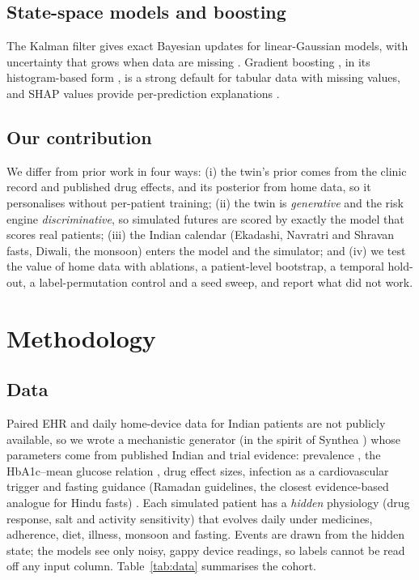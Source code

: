 \documentclass[conference]{IEEEtran}
\begin{document}
\subsection{State-space models and boosting} The Kalman filter \cite{kalman1960} gives exact Bayesian updates for linear-Gaussian models, with uncertainty that grows when data are missing \cite{durbin2012}. Gradient boosting \cite{friedman2001}, in its histogram-based form \cite{ke2017,pedregosa2011}, is a strong default for tabular data with missing values, and SHAP values provide per-prediction explanations \cite{lundberg2017}.

\subsection{Our contribution} We differ from prior work in four ways: (i) the twin's prior comes from the clinic record and published drug effects, and its posterior from home data, so it personalises without per-patient training; (ii) the twin is \emph{generative} and the risk engine \emph{discriminative}, so simulated futures are scored by exactly the model that scores real patients; (iii) the Indian calendar (Ekadashi, Navratri and Shravan fasts, Diwali, the monsoon) enters the model and the simulator; and (iv) we test the value of home data with ablations, a patient-level bootstrap, a temporal hold-out, a label-permutation control and a seed sweep, and report what did not work.

\section{Methodology}

\subsection{Data}
Paired EHR and daily home-device data for Indian patients are not publicly available, so we wrote a mechanistic generator (in the spirit of Synthea \cite{walonoski2018}) whose parameters come from published Indian and trial evidence: prevalence \cite{anjana2023}, the HbA1c--mean glucose relation \cite{nathan2008}, drug effect sizes, infection as a cardiovascular trigger \cite{kwong2018} and fasting guidance (Ramadan guidelines, the closest evidence-based analogue for Hindu fasts) \cite{hassanein2022}. Each simulated patient has a \emph{hidden} physiology (drug response, salt and activity sensitivity) that evolves daily under medicines, adherence, diet, illness, monsoon and fasting. Events are drawn from the hidden state; the models see only noisy, gappy device readings, so labels cannot be read off any input column. Table~\ref{tab:data} summarises the cohort.
\end{document}
